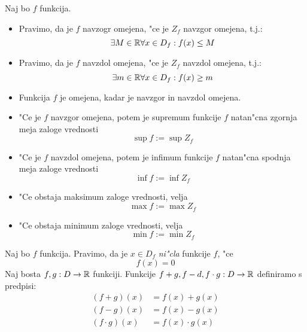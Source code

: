  Naj bo $f$ funkcija. 
\begin{itemize}
	\item Pravimo, da je $f$ navzogr omejena, "ce je $Z_f$ navzgor omejena, t.j.:
	\begin{equation*}
	\exists M \in \mathbb{R} \forall x \in D_f : f(x) \leq M
	\end{equation*}
	
	\item Pravimo, da je $f$ navzdol omejena, "ce je $Z_f$ navzdol omejena, t.j.:
	\begin{equation*}
	\exists m \in \mathbb{R} \forall x \in D_f : f(x) \geq m
	\end{equation*}
	
	\item Funkcija $f$ je omejena, kadar je navzgor in navzdol omejena.
	
	\item "Ce je $f$ navzgor omejena, potem je supremum funkcije $f$ natan"cna zgornja meja zaloge vrednosti
	\begin{equation*}
	\sup f := \sup Z_f
	\end{equation*}
	
	\item "Ce je $f$ navzdol omejena, potem je infimum funkcije $f$ natan"cna spodnja meja zaloge vrednosti
	\begin{equation*}
	\inf f := \inf Z_f
	\end{equation*}
	
	\item "Ce obstaja maksimum zaloge vrednosti, velja
	\begin{equation*}
	\max f := \max Z_f
	\end{equation*}
	
	\item "Ce obstaja minimum zaloge vrednosti, velja
	\begin{equation*}
	\min f := \min Z_f
	\end{equation*}
\end{itemize}
 Naj bo $f$ funkcija. Pravimo, da je $x \in D_f$ \emph{ni"cla} funkcije $f$, "ce
\begin{equation*}
f(x) = 0
\end{equation*}
 Naj bosta $f, g : D \to \mathbb{R}$ funkciji. Funkcije $f+g, f-d, f\cdot g: D \to \mathbb{R}$ definiramo s predpisi:
\begin{align*}
(f+g)(x) &= f(x) + g(x) \\
(f-g)(x) &= f(x) - g(x) \\
(f\cdot g)(x) &= f(x) \cdot g(x)
\end{align*}
